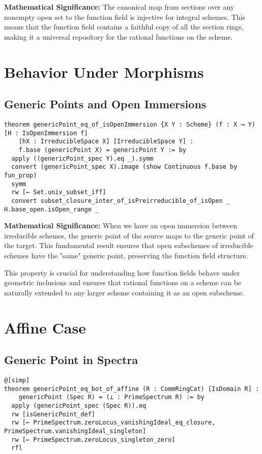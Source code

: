 \documentclass{article}
\theoremstyle{definition}
\begin{document}
\textbf{Mathematical Significance:} The canonical map from sections over any nonempty open set to the function field is injective for integral schemes. This means that the function field contains a faithful copy of all the section rings, making it a universal repository for the rational functions on the scheme.

\section{Behavior Under Morphisms}

\subsection{Generic Points and Open Immersions}

\begin{lstlisting}
theorem genericPoint_eq_of_isOpenImmersion {X Y : Scheme} (f : X ⟶ Y) [H : IsOpenImmersion f]
    [hX : IrreducibleSpace X] [IrreducibleSpace Y] :
    f.base (genericPoint X) = genericPoint Y := by
  apply ((genericPoint_spec Y).eq _).symm
  convert (genericPoint_spec X).image (show Continuous f.base by fun_prop)
  symm
  rw [← Set.univ_subset_iff]
  convert subset_closure_inter_of_isPreirreducible_of_isOpen _ H.base_open.isOpen_range _
\end{lstlisting}

\textbf{Mathematical Significance:} When we have an open immersion between irreducible schemes, the generic point of the source maps to the generic point of the target. This fundamental result ensures that open subschemes of irreducible schemes have the "same" generic point, preserving the function field structure.

This property is crucial for understanding how function fields behave under geometric inclusions and ensures that rational functions on a scheme can be naturally extended to any larger scheme containing it as an open subscheme.

\section{Affine Case}

\subsection{Generic Point in Spectra}

\begin{lstlisting}
@[simp]
theorem genericPoint_eq_bot_of_affine (R : CommRingCat) [IsDomain R] :
    genericPoint (Spec R) = (⊥ : PrimeSpectrum R) := by
  apply (genericPoint_spec (Spec R)).eq
  rw [isGenericPoint_def]
  rw [← PrimeSpectrum.zeroLocus_vanishingIdeal_eq_closure, PrimeSpectrum.vanishingIdeal_singleton]
  rw [← PrimeSpectrum.zeroLocus_singleton_zero]
  rfl
\end{lstlisting}
\end{document}
